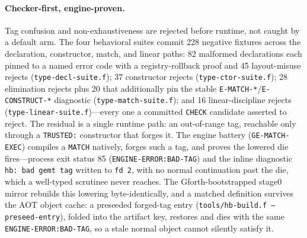 \documentclass[11pt]{article}
\newcommand{\code}[1]{\texttt{#1}}
\begin{document}
\paragraph{Checker-first, engine-proven.} Tag confusion and non-exhaustiveness
are rejected before runtime, not caught by a default arm. The four behavioral
suites commit 228 negative fixtures across the declaration, constructor,
match, and linear paths: 82 malformed declarations each pinned to a named
error code with a registry-rollback proof and 45 layout-misuse rejects
(\code{type-decl-suite.f}); 37 constructor rejects (\code{type-ctor-suite.f});
28 elimination rejects plus 20 that additionally pin the stable
\code{E-MATCH-*}/\code{E-CONSTRUCT-*} diagnostic (\code{type-match-suite.f});
and 16 linear-discipline rejects (\code{type-linear-suite.f})---every one a
committed \code{CHECK} candidate asserted to reject. The residual is a single
runtime path: an out-of-range tag, reachable only through a \code{TRUSTED:}
constructor that forges it. The engine battery (\code{GE-MATCH-EXEC}) compiles
a \code{MATCH} natively, forges such a tag, and proves the lowered die
fires---process exit status 85 (\code{ENGINE-ERROR:BAD-TAG}) and the inline diagnostic
\code{hb: bad gemt tag} written to \code{fd~2}, with no normal continuation
past the die, which a well-typed scrutinee never reaches. The
Gforth-bootstrapped stage0 mirror rebuilds this lowering byte-identically, and
a matched definition survives the AOT object cache: a preseeded forged-tag
entry (\code{tools/hb-build.f --preseed-entry}), folded into the artifact key,
restores and dies with the same \code{ENGINE-ERROR:BAD-TAG}, so a stale normal object
cannot silently satisfy it.
\end{document}
